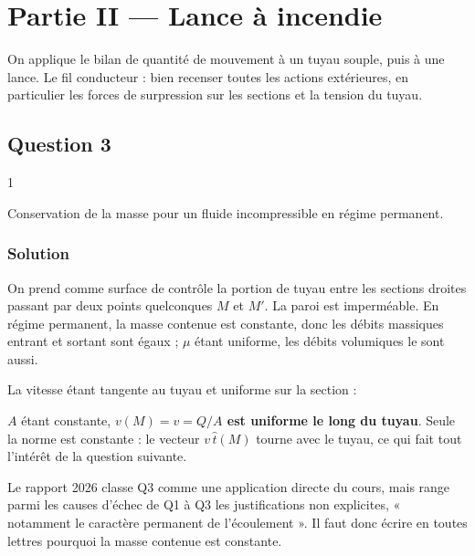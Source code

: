 \documentclass[11pt,a4paper]{article}
\newcommand{\equationajustee}[1]{%
  \sbox{\boiteequation}{$\displaystyle #1$}%
  \ifdim\wd\boiteequation>\linewidth
    \[\resizebox{\linewidth}{!}{\usebox{\boiteequation}}\]%
  \else
    \[#1\]%
  \fi}
\begin{document}
\hypertarget{partie-ii-lance-uxe0-incendie}{%
\section{Partie II --- Lance à incendie}\label{partie-ii-lance-uxe0-incendie}}

On applique le bilan de quantité de mouvement à un tuyau souple, puis à une lance. Le fil conducteur : bien recenser toutes les actions extérieures, en particulier les forces de surpression sur les sections et la tension du tuyau.

\hypertarget{question-3}{%
\subsection{Question 3}\label{question-3}}

\begin{indication}{1}

Conservation de la masse pour un fluide incompressible en régime permanent.

\end{indication}

\hypertarget{solution-2}{%
\subsubsection{Solution}\label{solution-2}}

On prend comme surface de contrôle la portion de tuyau entre les sections droites passant par deux points quelconques \(M\) et \(M'\). La paroi est imperméable. En régime permanent, la masse contenue est constante, donc les débits massiques entrant et sortant sont égaux ; \(\mu\) étant uniforme, les débits volumiques le sont aussi.

La vitesse étant tangente au tuyau et uniforme sur la section :

\equationajustee{Q=v(M)\,A=v(M')\,A .}

\(A\) étant constante, \textbf{\(v(M)=v=Q/A\) est uniforme le long du tuyau}. Seule la norme est constante : le vecteur \(v\,\hat t(M)\) tourne avec le tuyau, ce qui fait tout l'intérêt de la question suivante.

\begin{jury}

Le rapport 2026 classe Q3 comme une application directe du cours, mais range parmi les causes d'échec de Q1 à Q3 les justifications non explicites, « notamment le caractère permanent de l'écoulement ». Il faut donc écrire en toutes lettres pourquoi la masse contenue est constante.

\end{jury}
\end{document}
